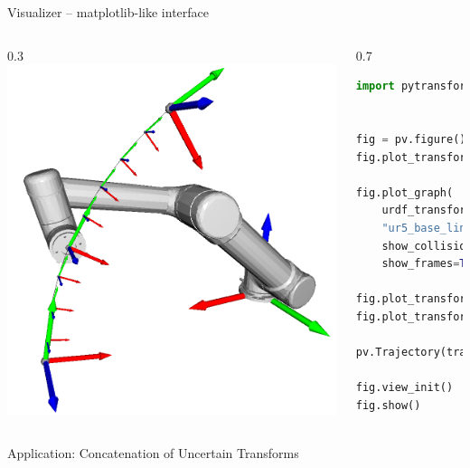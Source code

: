 \documentclass[14pt]{beamer}
\begin{document}
\begin{frame}[fragile]{Visualizer -- matplotlib-like interface}
\begin{columns}
\begin{column}{0.3\textwidth}
\includegraphics[width=\textwidth]{images/movement_primitives_cart_dmp_ur5}
\end{column}
\begin{column}{0.7\textwidth}
\begin{lstlisting}[language=Python]
import pytransform3d.visualizer as pv


fig = pv.figure()
fig.plot_transform(s=0.3)

fig.plot_graph(
    urdf_transform_manager,
    "ur5_base_link",
    show_collision_objects=True,
    show_frames=True)

fig.plot_transform(ee2base_start)
fig.plot_transform(ee2base_end)

pv.Trajectory(trajectory).add_artist(fig)

fig.view_init()
fig.show()
\end{lstlisting}
\end{column}
\end{columns}
\end{frame}

\begin{frame}
\begin{center}
\Large
Application: Concatenation of Uncertain Transforms
\end{center}
\end{frame}
\end{document}
